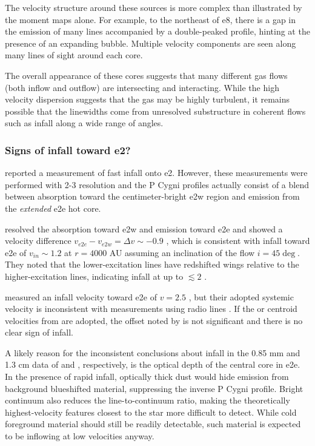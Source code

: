 \documentclass[twocolumn]{aastex61}
\begin{document}
The velocity structure around these sources is more complex than illustrated by
the moment maps alone.  For example, to the northeast of e8, there is a gap in
the emission of many lines accompanied by a double-peaked profile, hinting at
the presence of an expanding bubble.  Multiple velocity components are seen
along many lines of sight around each core.

The overall appearance of these cores suggests that many different gas flows
(both inflow and outflow) are intersecting and interacting.  While the high
velocity dispersion suggests that the gas may be highly turbulent, it remains
possible that the linewidths come from unresolved substructure in coherent
flows such as infall along a wide range of angles.

\subsubsection{Signs of infall toward e2?}
\citet{Zhang1997a}  reported a measurement of fast infall onto e2.
However, these measurements were performed with 2-3 \arcsec resolution and the
P Cygni profiles actually consist of a blend between absorption toward the
centimeter-bright e2w \hii region and emission from the \emph{extended} e2e hot
core.  

\citet{Goddi2016a} resolved the absorption toward e2w and emission
toward e2e and showed a velocity difference $v_{e2e}-v_{e2w} = \Delta v \sim
-0.9$ \kms, which is consistent with infall toward e2e of $v_{in}\sim1.2$ \kms
at $r=4000$ AU assuming an inclination of the flow $i=45\deg$.  They noted
that the lower-excitation \ammonia lines have redshifted wings relative to
the higher-excitation lines, indicating infall at up to $\lesssim 2$ \kms.

\citet{Shi2010a} measured an infall velocity toward e2e of $v=2.5$ \kms, 
but their adopted systemic velocity is inconsistent with measurements
using radio lines \citep{Goddi2016a}.  If the \methanol or \ammonia centroid
velocities from \citet{Goddi2016a} are adopted, the offset noted by
\citet{Shi2010a} is not significant and there is no clear sign of infall.

A likely reason for the inconsistent conclusions about infall in the 0.85 mm
and 1.3 cm data of \citet{Shi2010a} and \citet{Goddi2016a}, respectively, is
the optical depth of the central core in e2e.  In the presence of rapid infall,
optically thick dust would hide emission from background blueshifted material,
suppressing the inverse P Cygni profile.  Bright continuum also reduces the
line-to-continuum ratio, making the theoretically highest-velocity features
closest to the star more difficult to detect.  While cold foreground material
should still be readily detectable, such material is expected to be inflowing
at low velocities anyway.
\end{document}
